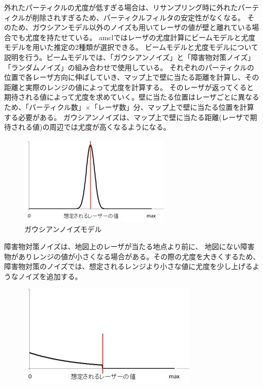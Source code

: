 \begin{enumerate}
    外れたパーティクルの尤度が低すぎる場合は、リサンプリング時に外れたパーティクルが削除されすぎるため、パーティクルフィルタの安定性がなくなる。
    そのため、ガウシアンモデル以外のノイズも用いてレーザの値が壁と離れている場合でも尤度を持たせている。
    amclではレーザの尤度計算にビームモデルと尤度モデルを用いた推定の2種類が選択できる。
    ビームモデルと尤度モデルについて説明を行う。ビームモデルでは、「ガウシアンノイズ」と「障害物対策ノイズ」「ランダムノイズ」の組み合わせで使用している。
    それぞれのパーティクルの位置で各レーザ方向に伸ばしていき、マップ上で壁に当たる距離を計算し、その距離と実際のレンジの値によって尤度を計算する。
    そのレーザが返ってくると期待される値によって尤度を求めていく。壁に当たる位置はレーザごとに異なるため、「パーティクル数」$\times$「レーザ数」分、マップ上で壁に当たる位置を計算する必要がある。
    ガウシアンノイズは、マップ上で壁に当たる距離(レーザで期待される値)の周辺では尤度が高くなるようになる。
    \begin{figure}[h]
      \begin{center}
        \includegraphics[width=.6\linewidth]{img/auto_18.jpg}
        \caption{ガウシアンノイズモデル}
        \label{auto:navstack:gaussnoise}
      \end{center}
    \end{figure}
    障害物対策ノイズは、地図上のレーザが当たる地点より前に、
    地図にない障害物がありレンジの値が小さくなる場合がある。その際の尤度を大きくするため、障害物対策のノイズでは、想定されるレンジより小さな値に尤度を少し上げるようなノイズを追加する。
    \begin{figure}[h]
      \begin{center}
        \includegraphics[width=.6\linewidth]{img/auto_19.jpg}

\end{center}
\end{figure}
\end{enumerate}
